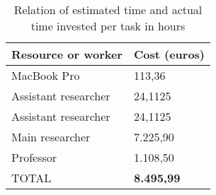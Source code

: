 		\begin{table}[H]
		\begin{center}
			\begin{tabular}{|| m{10em} | m{7em} ||}
				\hline
				\textbf{Resource or worker} & \textbf{Cost (euros)} \\
				\hline\hline
				MacBook Pro & 113,36  \\
				\hline
				Assistant researcher & 24,1125 \\
				\hline
				Assistant researcher & 24,1125 \\
				\hline
				Main researcher & 7.225,90 \\
				\hline
				Professor & 1.108,50 \\
				\hline
				TOTAL & \textbf{8.495,99} \\
				\hline
			\end{tabular}
		\end{center}
		\caption{Relation of estimated time and actual time invested  per task in hours}
		\label{table:15}
	\end{table}
	

